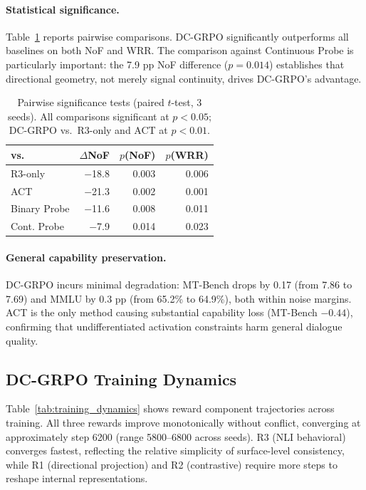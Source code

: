 \documentclass[11pt,a4paper]{article}
\begin{document}
\paragraph{Statistical significance.}
Table~\ref{tab:significance} reports pairwise comparisons. DC-GRPO significantly outperforms all baselines on both NoF and WRR. The comparison against Continuous Probe is particularly important: the 7.9 pp NoF difference ($p = 0.014$) establishes that directional geometry, not merely signal continuity, drives DC-GRPO's advantage.

\begin{table}[t]
\centering
\small
\begin{tabular}{lrrr}
\toprule
\textbf{vs.} & \textbf{$\Delta$NoF} & \textbf{$p$(NoF)} & \textbf{$p$(WRR)} \\
\midrule
R3-only & $-$18.8 & 0.003 & 0.006 \\
ACT & $-$21.3 & 0.002 & 0.001 \\
Binary Probe & $-$11.6 & 0.008 & 0.011 \\
Cont. Probe & $-$7.9 & 0.014 & 0.023 \\
\bottomrule
\end{tabular}
\caption{Pairwise significance tests (paired $t$-test, 3 seeds). All comparisons significant at $p < 0.05$; DC-GRPO vs.\ R3-only and ACT at $p < 0.01$.}
\label{tab:significance}
\end{table}

\paragraph{General capability preservation.}
DC-GRPO incurs minimal degradation: MT-Bench drops by 0.17 (from 7.86 to 7.69) and MMLU by 0.3 pp (from 65.2\% to 64.9\%), both within noise margins. ACT is the only method causing substantial capability loss (MT-Bench $-0.44$), confirming that undifferentiated activation constraints harm general dialogue quality.

\subsection{DC-GRPO Training Dynamics}

Table~\ref{tab:training_dynamics} shows reward component trajectories across training. All three rewards improve monotonically without conflict, converging at approximately step 6200 (range 5800--6800 across seeds). R3 (NLI behavioral) converges fastest, reflecting the relative simplicity of surface-level consistency, while R1 (directional projection) and R2 (contrastive) require more steps to reshape internal representations.
\end{document}

